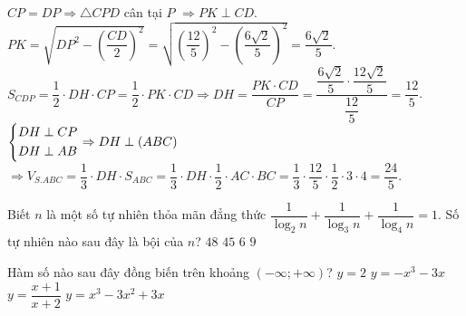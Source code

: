 \begin{ex}
{{}



$CP=DP \Rightarrow \triangle CPD$ cân tại $P$ $\Rightarrow PK \perp CD$.\\
$PK=\sqrt{DP^2-\left(\dfrac{CD}{2} \right)^2}=\sqrt{\left(\dfrac{12}{5} \right)^2-\left( \dfrac{6\sqrt{2}}{5} \right)^2}=\dfrac{6\sqrt{2}}{5}$.\\
$S_{CDP}=\dfrac{1}{2}\cdot DH\cdot CP=\dfrac{1}{2}\cdot PK\cdot CD \Rightarrow DH=\dfrac{PK\cdot CD}{CP}=\dfrac{\dfrac{6\sqrt{2}}{5} \cdot \dfrac{12\sqrt{2}}{5}}{\dfrac{12}{5}}=\dfrac{12}{5}$.\\
$\left\{\begin{aligned}&DH \perp CP \\&DH \perp AB\end{aligned}\right.\Rightarrow DH \perp (ABC)$\\
$\Rightarrow V_{S.ABC}=\dfrac{1}{3}\cdot DH\cdot S_{ABC}=\dfrac{1}{3}\cdot DH\cdot \dfrac{1}{2}\cdot AC\cdot BC=\dfrac{1}{3}\cdot \dfrac{12}{5}\cdot \dfrac{1}{2}\cdot 3\cdot 4=\dfrac{24}{5}$.


}
\end{ex}

\begin{ex}%
Biết $n$ là một số tự nhiên thỏa mãn đẳng thức $\dfrac{1}{\log_2n}+\dfrac{1}{\log_3n}+\dfrac{1}{\log_4n}=1$. Số tự nhiên nào sau đây là bội của $n$?
\choice
{\True $48$}
{$45$}
{$6$}
{$9$}
\end{ex}

\begin{ex}%
Hàm số nào sau đây đồng biến trên khoảng $(-\infty; +\infty)$?
\choice
{$y=2$}
{$y=-x^3-3x$}
{$y=\dfrac{x+1}{x+2}$}
{\True $y=x^3-3x^2+3x$}
\end{ex}

